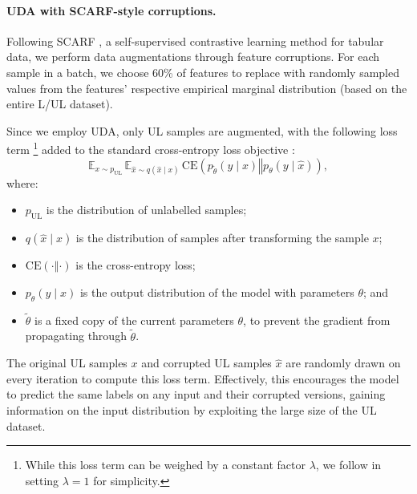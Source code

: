 \documentclass{article}
\newcommand{\CE}[2]{\text{CE}(#1 \mathrel{\Vert} #2)}
\begin{document}
\paragraph{UDA with SCARF-style corruptions.}
Following SCARF \cite{bahri2022scarf}, a self-supervised contrastive learning method for
tabular data, we perform data augmentations through feature corruptions.
For each sample in a batch, we choose 60\% of features to replace with randomly sampled
values from the features' respective empirical marginal distribution (based on the
entire L/UL dataset).

Since we employ UDA, only UL samples are augmented, with the following loss term%
\footnote{%
  While this loss term can be weighed by a constant factor $\lambda$, we follow
  \cite{xie2020unsupervised} in setting $\lambda = 1$ for simplicity.
} added to the standard cross-entropy loss objective \cite{xie2020unsupervised}:
\begin{equation}
  \mathbb{E}_{x \sim p_\text{UL}}\,
  \mathbb{E}_{\hat{x} \sim q(\hat{x} \mid x)}\,
  \CE{p_{\tilde{\theta}}(y \mid x)}{p_\theta(y \mid \hat{x})},
\end{equation} where:
\begin{itemize}
  \item $p_\text{UL}$ is the distribution of unlabelled samples;
  \item $q(\hat{x} \mid x)$ is the distribution of samples after transforming the sample
  $x$;
  \item $\CE{\cdot}{\cdot}$ is the cross-entropy loss;
  \item $p_\theta(y \mid x)$ is the output distribution of the model with parameters
  $\theta$; and
  \item $\tilde{\theta}$ is a fixed copy of the current parameters $\theta$, to prevent
  the gradient from propagating through $\tilde{\theta}$.
\end{itemize}
The original UL samples $x$ and corrupted UL samples $\hat{x}$ are randomly drawn on
every iteration to compute this loss term.
Effectively, this encourages the model to predict the same labels on any input and their
corrupted versions, gaining information on the input distribution by exploiting the
large size of the UL dataset.
\end{document}
